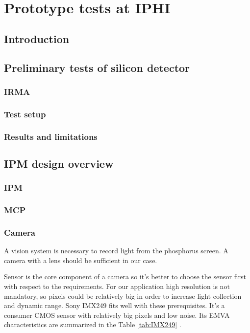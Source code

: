 \chapter{Prototype tests at IPHI}
\cleardoublepage

\minitoc

\section{Introduction}
\begin{refsection}
  \label{ch4:Introduction}

  \section{Preliminary tests of silicon detector}
  \subsection{IRMA}
  \cite{Chaumont1981}
  
  \subsection{Test setup}
  \cite{advacam2019}
  \cite{Kraus2011}

  
  \subsection{Results and limitations}

  \section{IPM design overview}
  \subsection{IPM}
  \subsection{MCP}
  \subsection{Camera}
  A vision system is necessary to record light from the phosphorus screen.
  A camera with a lens should be sufficient in our case.

  Sensor is the core component of a camera so it's better to choose the sensor first with respect to the requirements.
  For our application high resolution is not mandatory, so pixels could be relatively big in order to increase light collection and dynamic range.
  Sony IMX249 fits well with these prerequisites. It's a consumer CMOS sensor with relatively big pixels and low noise.
  Its EMVA characteristics are summarized in the Table \ref{tab:IMX249} \cite{emva2010}.
  


\end{refsection}
